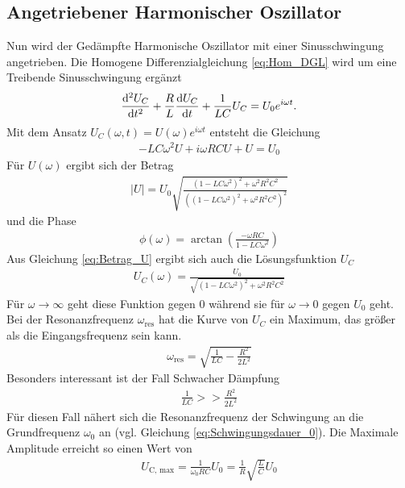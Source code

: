\subsection{Angetriebener Harmonischer Oszillator}
Nun wird der Gedämpfte Harmonische Oszillator mit einer Sinusschwingung angetrieben.
Die Homogene Differenzialgleichung \ref{eq:Hom_DGL} wird um eine Treibende Sinusschwingung ergänzt
\begin{align}
    \frac{\mathop{}\!\mathrm{d}^2 U_C}{\mathop{}\!\mathrm{d} t^2}+ \frac{R}{L} \frac{\mathop{}\!\mathrm{d} U_C}{\mathop{}\!\mathrm{d} t} + \frac{1}{LC} U_C = U_0 e^{i \omega t} .
    \label{eq:inhom_DGL}
\end{align}
Mit dem Ansatz $U_C(\omega, t) = U(\omega) e^{i \omega t}$ entsteht die Gleichung
\begin{align*}
    -LC \omega^2 U + i \omega RC U + U = U_0
\end{align*}
Für $U(\omega)$ ergibt sich der Betrag
\begin{align}
    \mid U \mid = U_0 \sqrt{\frac{\left(1-LC \omega^2 \right)^2+ \omega^2 R^2 C^2}{\left(\left(1-LC \omega^2 \right)^2 + \omega^2 R^2 C^2\right)^2 }}
    \label{eq:Betrag_U}
\end{align}
und die Phase 
\begin{align}
    \phi(\omega) = \arctan\left(\frac{-\omega RC}{1-LC \omega^2}\right)
    \label{eq:Phi_omega}
\end{align}
Aus Gleichung \ref{eq:Betrag_U} ergibt sich auch die Lösungsfunktion $U_C$
\begin{align}
    U_C(\omega) = \frac{U_0}{\sqrt{\left(1-LC \omega^2 \right)^2+ \omega^2 R^2 C^2}}
    \label{eq:U_c_omega}
\end{align}
Für $\omega \rightarrow \infty$ geht diese Funktion gegen 0 während sie für $\omega \rightarrow 0$ gegen $U_0$ geht.
Bei der Resonanzfrequenz $\omega_\text{res}$ hat die Kurve von $U_C$ ein Maximum, das größer als die Eingangsfrequenz sein kann. 
\begin{align}
    \omega_\text{res} = \sqrt{\frac{1}{LC}- \frac{R^2}{2L^2}}
    \label{eq:Resonanzfrequenz}
\end{align}
Besonders interessant ist der Fall Schwacher Dämpfung 
\begin{align*}
    \frac{1}{LC} >> \frac{R^2}{2L^2}
\end{align*}
Für diesen Fall nähert sich die Resonanzfrequenz der Schwingung an die Grundfrequenz $\omega_0$ an (vgl. Gleichung \eqref{eq:Schwingungsdauer_0}).
Die Maximale Amplitude erreicht so einen Wert von
\begin{align}
    U_\text{C, max} = \frac{1}{\omega_0 RC}U_0 = \frac{1}{R}\sqrt{\frac{L}{C}}U_0
    \label{eq:UC_max}
\end{align}
